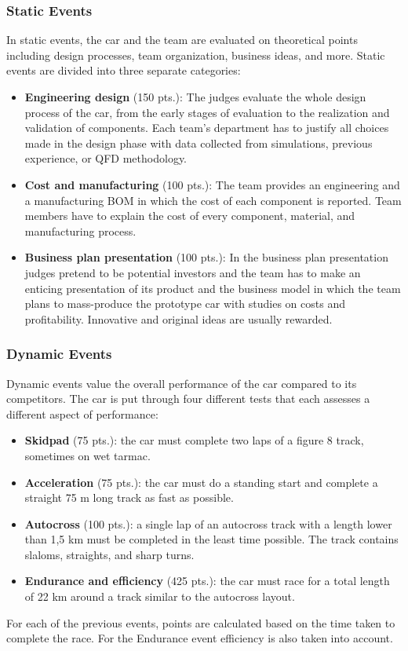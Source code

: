 \subsubsection{Static Events}
In static events, the car and the team are evaluated on theoretical points including design processes, team organization, business ideas, and more.
Static events are divided into three separate categories:
\begin{itemize}
    \item \textbf{Engineering design} (150 pts.): The judges evaluate the whole design process of the car, from the early stages of evaluation to the realization and validation of components. Each team's department has to justify all choices made in the design phase with data collected from simulations, previous experience, or QFD methodology.
    \item \textbf{Cost and manufacturing} (100 pts.): The team provides an engineering and a manufacturing BOM in which the cost of each component is reported. Team members have to explain the cost of every component, material, and manufacturing process.
    \item \textbf{Business plan presentation} (100 pts.): In the business plan presentation judges pretend to be potential investors and the team has to make an enticing presentation of its product and the business model in which the team plans to mass-produce the prototype car with studies on costs and profitability. Innovative and original ideas are usually rewarded.
\end{itemize}

\subsubsection{Dynamic Events}
Dynamic events value the overall performance of the car compared to its competitors. The car is put through four different tests that each assesses a different aspect of performance:
\begin{itemize}
    \item \textbf{Skidpad} (75 pts.): the car must complete two laps of a figure 8 track, sometimes on wet tarmac.
    \item \textbf{Acceleration} (75 pts.): the car must do a standing start and complete a straight 75 m long track as fast as possible.
    \item \textbf{Autocross} (100 pts.): a single lap of an autocross track with a length lower than 1,5 km must be completed in the least time possible. The track contains slaloms, straights, and sharp turns.
    \item \textbf{Endurance and efficiency} (425 pts.): the car must race for a total length of 22 km around a track similar to the autocross layout.
\end{itemize}
For each of the previous events, points are calculated based on the time taken to complete the race. For the Endurance event efficiency is also taken into account.

